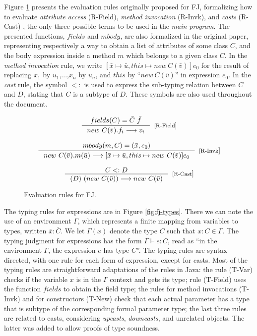 \documentclass[tese,capa,english]{texufpel}
\begin{document}
Figure \ref{fig:fj-eval-orig} presents the evaluation rules originally proposed for FJ, formalizing how to evaluate \emph{attribute access} (R-Field), \emph{method invocation} (R-Invk), and \emph{casts} (R-Cast) \cite{Igarashi:2001:FJM:503502.503505}, the only three possible terms to be used in the \emph{main program}. The presented functions, $fields$ and $mbody$, are also formalized in the original paper, representing respectively a way to obtain a list of attributes of some class $C$, and the body expression inside a method $m$ which belongs to a given class $C$. In the \emph{method invocation} rule, we write $[\bar{x} \mapsto \bar{u}, this \mapsto new ~ C(\bar{v})]e_0$ for the result of replacing $x_1$ by $u_1$,...,$x_n$ by $u_n$, and $this$ by ``$new ~ C(\bar{v})$'' in expression $e_0$. In the \emph{cast} rule, the symbol $<:$ is used to express the sub-typing relation between $C$ and $D$, stating that $C$ is a subtype of $D$. These symbols are also used throughout the document.

\begin{figure}[!htb]
\[
\begin{array}{c} 
\inference{fields(C) = \bar{C}~\bar{f}}
          {new ~ C(\bar{v}).f_i --> v_i}[[R-Field]]
\\ \\	
\inference{mbody(m, C) = (\bar{x}, e_0)}
          {new ~ C(\bar{v}).m(\bar{u}) --> [\bar{x} \mapsto \bar{u}, this \mapsto new ~ C(\bar{v})]e_0}[[R-Invk]]
\\ \\	
\inference{C <: D}
{(D) ~ (new ~ C(\bar{v})) --> new ~ C(\bar{v})}[[R-Cast]]
\\
\end{array}
\]
\caption{Evaluation rules for FJ.}
\label{fig:fj-eval-orig}
\end{figure}

\pagebreak

The typing rules for expressions are in Figure \ref{fig:fj-types}. There we can note the use of an environment $\Gamma$, which represents a finite mapping from variables to types, written $\bar{x}: \bar{C}$. We let $\Gamma(x)$ denote the type $C$ such that $x: C \in \Gamma$. The typing judgment for expressions has the form $\Gamma \vdash e : C$, read as ``in the environment $\Gamma$, the expression $e$ has type $C$''. The typing rules are syntax directed, with one rule for each form of expression, except for casts. Most of the typing rules are straightforward adaptations of the rules in Java: the rule (T-Var) checks if the variable $x$ is in the $\Gamma$ context and gets its type; rule (T-Field) uses the function $fields$ to obtain the field type; the rules for method invocations (T-Invk) and for constructors (T-New) check that each actual parameter has a type that is subtype of the corresponding formal parameter type; the last three rules are related to casts, considering \emph{upcasts}, \emph{downcasts}, and unrelated objects. The latter was added to allow proofs of type soundness.
\end{document}
